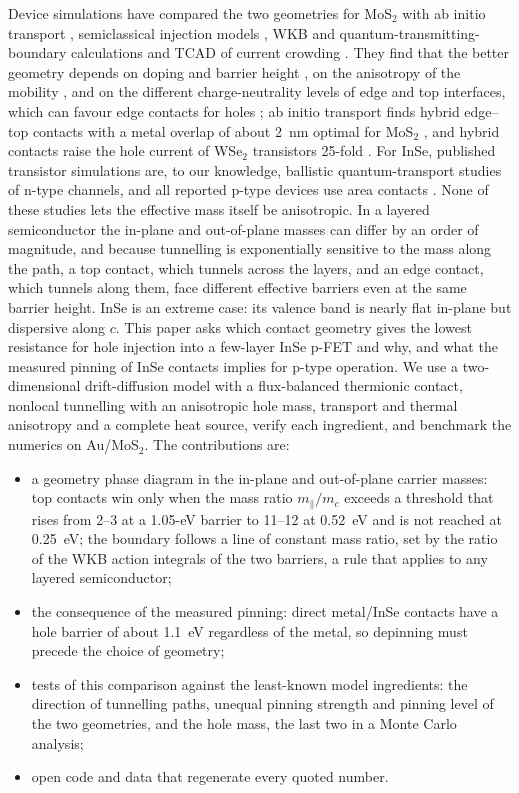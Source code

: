 \documentclass[11pt]{article}
\begin{document}
Device simulations have compared the two geometries for MoS$_2$ with ab initio transport \cite{refszabo,refparto}, semiclassical injection models \cite{refarutchelvan}, WKB and quantum-transmitting-boundary calculations \cite{refdeylgat22,refdeylgat23,refdeylgat26} and TCAD of current crowding \cite{refsuryavanshi}. They find that the better geometry depends on doping and barrier height \cite{refdeylgat23}, on the anisotropy of the mobility \cite{refsuryavanshi}, and on the different charge-neutrality levels of edge and top interfaces, which can favour edge contacts for holes \cite{refparto}; ab initio transport finds hybrid edge--top contacts with a metal overlap of about 2~nm optimal for MoS$_2$ \cite{refpal}, and hybrid contacts raise the hole current of WSe$_2$ transistors 25-fold \cite{refchen25}. For InSe, published transistor simulations are, to our knowledge, ballistic quantum-transport studies of n-type channels, and all reported p-type devices use area contacts \cite{refhu,refwei,refkim24,refpasquale23,refseok}. None of these studies lets the effective mass itself be anisotropic. In a layered semiconductor the in-plane and out-of-plane masses can differ by an order of magnitude, and because tunnelling is exponentially sensitive to the mass along the path, a top contact, which tunnels across the layers, and an edge contact, which tunnels along them, face different effective barriers even at the same barrier height. InSe is an extreme case: its valence band is nearly flat in-plane \cite{refmag,refceferino} but dispersive along $c$. This paper asks which contact geometry gives the lowest resistance for hole injection into a few-layer InSe p-FET and why, and what the measured pinning of InSe contacts implies for p-type operation. We use a two-dimensional drift-diffusion model with a flux-balanced thermionic contact, nonlocal tunnelling with an anisotropic hole mass, transport and thermal anisotropy and a complete heat source, verify each ingredient, and benchmark the numerics on Au/MoS$_2$. The contributions are:
\begin{itemize}
\item a geometry phase diagram in the in-plane and out-of-plane carrier masses: top contacts win only when the mass ratio $m_\parallel/m_c$ exceeds a threshold that rises from 2--3 at a 1.05-eV barrier to 11--12 at 0.52~eV and is not reached at 0.25~eV; the boundary follows a line of constant mass ratio, set by the ratio of the WKB action integrals of the two barriers, a rule that applies to any layered semiconductor;
\item the consequence of the measured pinning: direct metal/InSe contacts have a hole barrier of about 1.1~eV regardless of the metal, so depinning must precede the choice of geometry;
\item tests of this comparison against the least-known model ingredients: the direction of tunnelling paths, unequal pinning strength and pinning level of the two geometries, and the hole mass, the last two in a Monte Carlo analysis;
\item open code and data that regenerate every quoted number.
\end{itemize}
\end{document}
